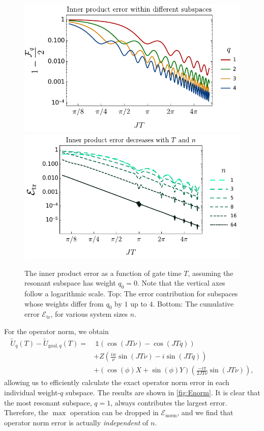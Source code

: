 \begin{figure}
\centering
\includegraphics[width=.67\textwidth]{img/EtrVsW} \\
\hspace{.73cm} \includegraphics[width=.7\textwidth]{img/EtrVsTandN}
\caption{The inner product error as a function of gate time $T$, assuming the resonant subspace has weight $q_0 = 0$. Note that the vertical axes follow a logarithmic scale. Top: The error contribution for subspaces whose weights differ from $q_0$ by $1$ up to $4$. Bottom: The cumulative error $\mathcal{E}_\text{tr}$, for various system sizes $n$. }
\label{fig:Etrace}
\end{figure}


For the operator norm, we obtain 
\begin{align*}
\tilde{U}_q(T) - \tilde{U}_{\text{goal},q}(T) = & \ \mathds{1} \left( \cos( J T \nu ) - \cos(J T q) \right) \\
& + Z \left( \frac{iw}{\nu} \sin( J T \nu ) - i \sin(J T q) \right) \\
& + (\cos(\phi) X + \sin(\phi) Y ) \left( \frac{-i \pi}{2 J T \nu} \sin(J T \nu) \right),
\end{align*}
allowing us to efficiently calculate the exact operator norm error in each individual weight-$q$ subspace. The results are shown in \cref{fig:Enorm}. It is clear that the most resonant subspace, $q=1$, always contributes the largest error. Therefore, the $\max$ operation can be dropped in $\mathcal{E}_\text{norm}$, and we find that operator norm error is actually \emph{independent} of $n$. 

